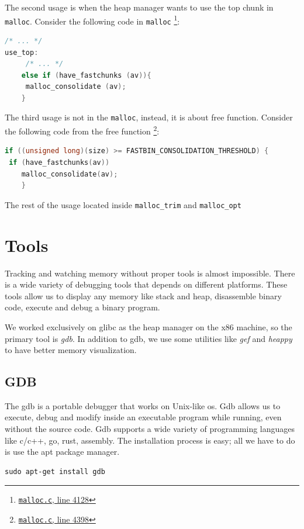 \documentclass{masterthesis}
\newcommand*\libc{glibc}
\newcommand*\mallocc{\lstinline{malloc}\xspace}
\begin{document}
The second usage is when the heap manager wants to use the top chunk in \mallocc{}. Consider the following code in \mallocc{} \footnote{\href{https://sourceware.org/git/?p=glibc.git;a=blob;f=malloc/malloc.c;h=f7cd29bc2f93e1082ee77800bd64a4b2a2897055;hb=9ea3686266dca3f004ba874745a4087a89682617\#l4128}{\texttt{malloc.c}, line 4128}}:

\begin{lstlisting}[language=c,frame=tlrb]
 /* ... */
use_top:
	 /* ... */
	else if (have_fastchunks (av)){
	 malloc_consolidate (av);
	}
\end{lstlisting}

The third usage is not in the \mallocc{}, instead, it is about free function. Consider the following code from the free function \footnote{\href{https://sourceware.org/git/?p=glibc.git;a=blob;f=malloc/malloc.c;h=f7cd29bc2f93e1082ee77800bd64a4b2a2897055;hb=9ea3686266dca3f004ba874745a4087a89682617\#l4398}{\texttt{malloc.c}, line 4398}}:

\begin{lstlisting}[language=c,frame=tlrb]
if ((unsigned long)(size) >= FASTBIN_CONSOLIDATION_THRESHOLD) {
 if (have_fastchunks(av))
	malloc_consolidate(av);
	}
\end{lstlisting}

The rest of the usage located inside \lstinline{malloc_trim} and \lstinline{malloc_opt}
\chapter{Tools }
Tracking and watching memory without proper tools is almost impossible. There is a wide variety of debugging tools that depends on different platforms. These tools allow us to display any memory like stack and heap, disassemble binary code, execute and debug a binary program.

We worked exclusively on \libc{} as the heap manager on the x86 machine, so the primary tool is \emph{gdb}. In addition to gdb, we use some utilities like \emph{gef} and \emph{heappy} to have better memory visualization.


\section{GDB}
The gdb is a portable debugger that works on Unix-like os. Gdb allows us to execute, debug and modify inside an executable program while running, even without the source code. Gdb supports a wide variety of programming languages like c/c++, go, rust, assembly. The installation process is easy; all we have to do is use the apt package manager.
\begin{lstlisting}[frame=tlrb]
sudo apt-get install gdb
\end{lstlisting}
\end{document}
